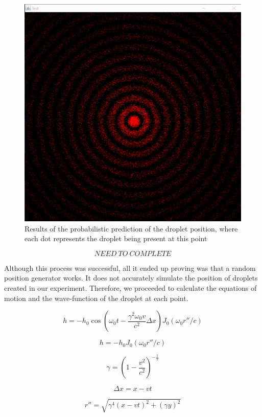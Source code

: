 \begin{figure}
\centering
\includegraphics[width=\textwidth]{simulation/probabiltyPosition.png}
\caption{Results of the probabilistic prediction of the droplet position, where each dot represents the droplet being present at this point}
\label{fig:probabilisticPrediction}
\end{figure}

\begin{equation}
    NEED~TO~COMPLETE
    \label{equ:probWaveEqn}
\end{equation}

Although this process was successful, all it ended up proving was that a random position generator works. It does not accurately simulate the position of droplets created in our experiment. Therefore, we proceeded to calculate the equations of motion and the wave-function of the droplet at each point.

$$h = -h_0 \cos{(\omega_0 t - \frac{\gamma^2\omega_0 v}{c^2} \Delta x)}J_0(\omega_0 r''/c)$$

$$ h = -h_0 J_0(\omega_0 r''/c)$$

$$\gamma = (1-\frac{v^2}{c^2})^{-{\frac{1}{2}}}$$

$$\Delta x = x - vt$$

$$r'' = \sqrt{\gamma^4(x-vt)^2 + (\gamma y)^2}$$

